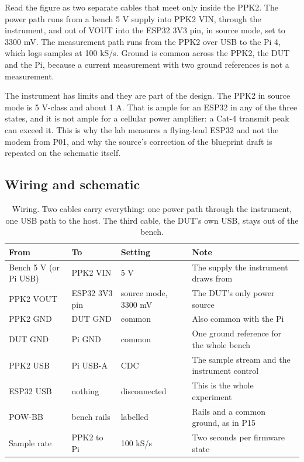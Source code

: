 Read the figure as two separate cables that meet only inside the PPK2. The power path runs
from a bench 5 V supply into PPK2 VIN, through the instrument, and out of VOUT into the
ESP32 3V3 pin, in source mode, set to 3300 mV. The measurement path runs from the PPK2 over
USB to the Pi 4, which logs samples at 100 kS/s. Ground is common across the PPK2, the DUT
and the Pi, because a current measurement with two ground references is not a measurement.

The instrument has limits and they are part of the design. The PPK2 in source mode is
5 V-class and about 1 A. That is ample for an ESP32 in any of the three states, and it is
not ample for a cellular power amplifier: a Cat-4 transmit peak can exceed it. This is why
the lab measures a flying-lead ESP32 and not the modem from P01, and why the source's
correction of the blueprint draft is repeated on the schematic itself.

\subsection*{Wiring and schematic}


\begin{table}[H]\centering\small
\begin{tabular}{p{34mm}p{34mm}p{26mm}p{56mm}}
\toprule
From & To & Setting & Note \\
\midrule
Bench 5 V (or Pi USB) & PPK2 VIN & 5 V & The supply the instrument draws from \\
PPK2 VOUT & ESP32 3V3 pin & source mode, 3300 mV & The DUT's only power source \\
PPK2 GND & DUT GND & common & Also common with the Pi \\
DUT GND & Pi GND & common & One ground reference for the whole bench \\
PPK2 USB & Pi USB-A & CDC & The sample stream and the instrument control \\
ESP32 USB & nothing & disconnected & This is the whole experiment \\
POW-BB & bench rails & labelled & Rails and a common ground, as in P15 \\
Sample rate & PPK2 to Pi & 100 kS/s & Two seconds per firmware state \\
\bottomrule
\end{tabular}
\caption{Wiring. Two cables carry everything: one power path through the instrument, one
USB path to the host. The third cable, the DUT's own USB, stays out of the bench.}
\end{table}

